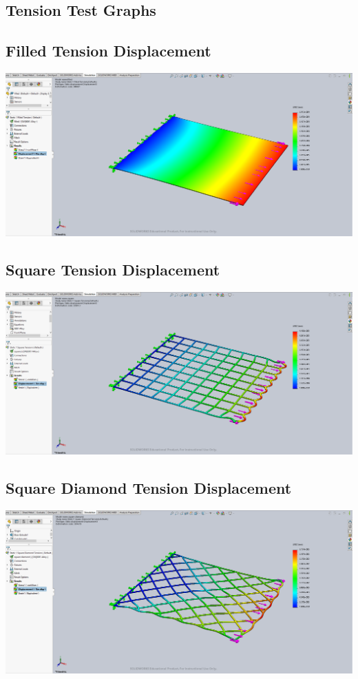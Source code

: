 \documentclass[12pt, letterpaper]{article}
\begin{document}
\newpage
\begin{singlespace}
\section{Tension Test Graphs}
\label{ap:te}

\subsection{Filled Tension Displacement}
\label{ap:f-te-d}
\includegraphics[width=0.8\linewidth]{./graphs/tension/filled-tension-displacement}

\subsection{Square Tension Displacement}
\label{ap:s-te-d}
\includegraphics[width=0.8\linewidth]{./graphs/tension/square-tension-displacement}

\subsection{Square Diamond Tension Displacement}
\label{ap:sd-te-d}
\includegraphics[width=0.8\linewidth]{./graphs/tension/square-diamond-tension-displacement}


\end{singlespace}
\end{document}
